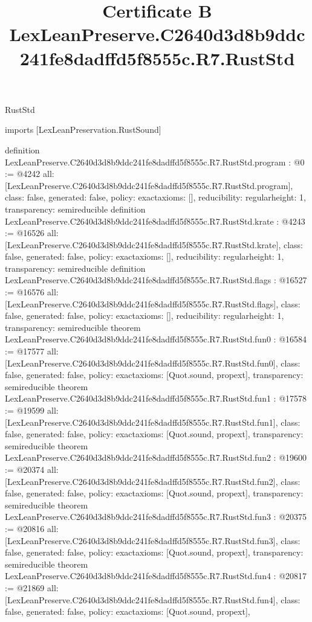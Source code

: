 \begin{lexlean}{RustStd}
\title{Certificate B LexLeanPreserve.C2640d3d8b9ddc241fe8dadffd5f8555c.R7.RustStd}
\begin{coremodule}
imports [LexLeanPreservation.RustSound]

definition LexLeanPreserve.C2640d3d8b9ddc241fe8dadffd5f8555c.R7.RustStd.program : @0 := @4242 {
  all: [LexLeanPreserve.C2640d3d8b9ddc241fe8dadffd5f8555c.R7.RustStd.program],
  class: false,
  generated: false,
  policy: exact{axioms: []},
  reducibility: regular{height: 1},
  transparency: semireducible
}
definition LexLeanPreserve.C2640d3d8b9ddc241fe8dadffd5f8555c.R7.RustStd.krate : @4243 := @16526 {
  all: [LexLeanPreserve.C2640d3d8b9ddc241fe8dadffd5f8555c.R7.RustStd.krate],
  class: false,
  generated: false,
  policy: exact{axioms: []},
  reducibility: regular{height: 1},
  transparency: semireducible
}
definition LexLeanPreserve.C2640d3d8b9ddc241fe8dadffd5f8555c.R7.RustStd.flags : @16527 := @16576 {
  all: [LexLeanPreserve.C2640d3d8b9ddc241fe8dadffd5f8555c.R7.RustStd.flags],
  class: false,
  generated: false,
  policy: exact{axioms: []},
  reducibility: regular{height: 1},
  transparency: semireducible
}
theorem LexLeanPreserve.C2640d3d8b9ddc241fe8dadffd5f8555c.R7.RustStd.fun0 : @16584 := @17577 {
  all: [LexLeanPreserve.C2640d3d8b9ddc241fe8dadffd5f8555c.R7.RustStd.fun0],
  class: false,
  generated: false,
  policy: exact{axioms: [Quot.sound, propext]},
  transparency: semireducible
}
theorem LexLeanPreserve.C2640d3d8b9ddc241fe8dadffd5f8555c.R7.RustStd.fun1 : @17578 := @19599 {
  all: [LexLeanPreserve.C2640d3d8b9ddc241fe8dadffd5f8555c.R7.RustStd.fun1],
  class: false,
  generated: false,
  policy: exact{axioms: [Quot.sound, propext]},
  transparency: semireducible
}
theorem LexLeanPreserve.C2640d3d8b9ddc241fe8dadffd5f8555c.R7.RustStd.fun2 : @19600 := @20374 {
  all: [LexLeanPreserve.C2640d3d8b9ddc241fe8dadffd5f8555c.R7.RustStd.fun2],
  class: false,
  generated: false,
  policy: exact{axioms: [Quot.sound, propext]},
  transparency: semireducible
}
theorem LexLeanPreserve.C2640d3d8b9ddc241fe8dadffd5f8555c.R7.RustStd.fun3 : @20375 := @20816 {
  all: [LexLeanPreserve.C2640d3d8b9ddc241fe8dadffd5f8555c.R7.RustStd.fun3],
  class: false,
  generated: false,
  policy: exact{axioms: [Quot.sound, propext]},
  transparency: semireducible
}
theorem LexLeanPreserve.C2640d3d8b9ddc241fe8dadffd5f8555c.R7.RustStd.fun4 : @20817 := @21869 {
  all: [LexLeanPreserve.C2640d3d8b9ddc241fe8dadffd5f8555c.R7.RustStd.fun4],
  class: false,
  generated: false,
  policy: exact{axioms: [Quot.sound, propext]},
}
\end{coremodule}
\end{lexlean}
